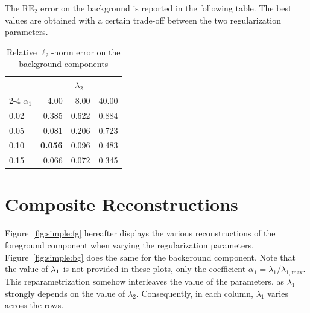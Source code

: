     The $\mathrm{RE}_2$ error on the background is reported in the following table. The best values are obtained with a certain trade-off between the two regularization parameters.  

    \begin{table}[h]
        \centering
        \begin{tabular}{l|rrr}
            \toprule
             & \multicolumn{3}{c}{$\lambda_2$} \\
            \cmidrule(lr){2-4}
            $\alpha_1$ & 4.00 & 8.00 & 40.00 \\
            \midrule
            0.02 & 0.385 & 0.622 & 0.884 \\
            0.05 & 0.081 & 0.206 & 0.723 \\
            0.10 & \textbf{0.056} & 0.096 & 0.483 \\
            0.15 & 0.066 & 0.072 & 0.345 \\
            \bottomrule
        \end{tabular}
        \caption{Relative $\ell_2$-norm error on the background components \label{tab:rl2-bg}}
    \end{table}

\vfill
    

\section{Composite Reconstructions}
    \label{app:reconstructions}


    Figure~\ref{fig:simple:fg} hereafter displays the various reconstructions of the foreground component when varying the regularization parameters. Figure~\ref{fig:simple:bg} does the same for the background component. Note that the value of $\lambda_{1}$ is not provided in these plots, only the coefficient $\alpha_1 = \lambda_1 / \lambda_{1, \mathrm{max}}$. This reparametrization somehow interleaves the value of the parameters, as $\lambda_1$ strongly depends on the value of $\lambda_2$. Consequently, in each column, $\lambda_1$ varies across the rows. %

\vfill



